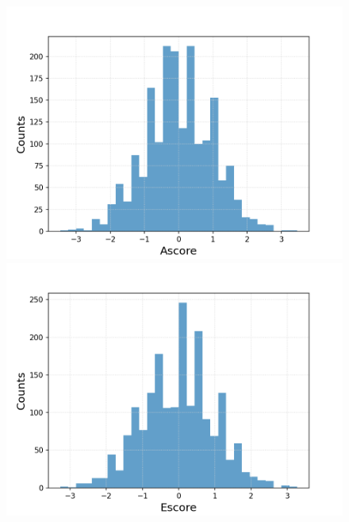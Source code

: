 \documentclass{article}
\begin{document}
\begin{figure}[h!]
	\centering
	\begin{minipage}[b]{0.32\textwidth}
		\includegraphics[width=\textwidth]{plots/drugsPlots/Ascore.png}

	\end{minipage}
	\begin{minipage}[b]{0.32\textwidth}
		\includegraphics[width=\textwidth]{plots/drugsPlots/Escore.png}


\end{minipage}
\end{figure}
\end{document}
